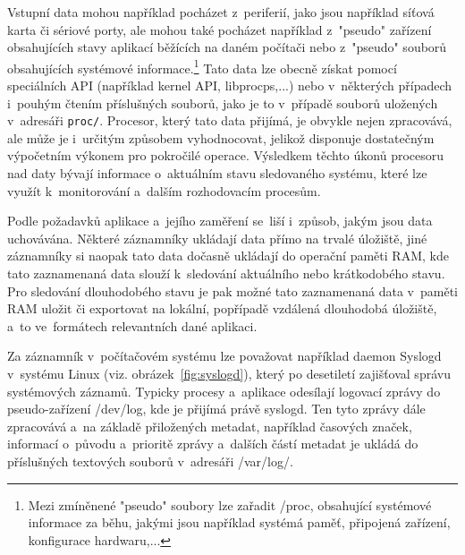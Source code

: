 Vstupní data mohou například pocházet z~periferií, jako jsou například síťová karta či sériové porty, ale mohou také pocházet například z~"pseudo" zařízení obsahujících stavy aplikací běžících na daném počítači nebo z~"pseudo" souborů obsahujících systémové informace.\footnote{Mezi zmíněnené "pseudo" soubory lze zařadit /proc, obsahující systémové informace za běhu, jakými jsou například systémá paměť, připojená zařízení, konfigurace hardwaru,...} Tato data lze obecně získat pomocí speciálních API (například kernel API, libprocps,...) nebo v~některých případech i~pouhým čtením příslušných souborů, jako je to v~případě souborů uložených v~adresáři \texttt{proc/}. Procesor, který tato data přijímá, je obvykle nejen zpracovává, ale může je i~určitým způsobem vyhodnocovat, jelikož disponuje dostatečným výpočetním výkonem pro pokročilé operace. Výsledkem těchto úkonů procesoru nad daty bývají informace o~aktuálním stavu sledovaného systému, které lze využít k~monitorování a~dalším rozhodovacím procesům.~\cite{linux_libprocsp, linux_in_action_log_and_monitoring}

% 
Podle požadavků aplikace a~jejího zaměření se~liší i~způsob, jakým jsou data uchovávána. Některé záznamníky ukládají data přímo na trvalé úložiště, jiné záznamníky si naopak tato data dočasně ukládají do operační paměti RAM, kde tato zaznamenaná data slouží k~sledování aktuálního nebo krátkodobého stavu. Pro sledování dlouhodobého stavu je pak možné tato zaznamenaná data v~paměti RAM uložit či exportovat na lokální, popřípadě vzdálená dlouhodobá úložiště, a~to ve~formátech relevantních dané aplikaci.~\cite{labview, linux_in_action_log_and_monitoring}

Za záznamník v~počítačovém systému lze považovat například daemon Syslogd v~systému Linux (viz. obrázek~\ref{fig:syslogd}), který po desetiletí zajišťoval správu systémových záznamů. Typicky procesy a~aplikace odesílají logovací zprávy do pseudo-zařízení /dev/log, kde je přijímá právě syslogd. Ten tyto zprávy dále zpracovává a~na základě přiložených metadat, například časových značek, informací o~původu a~prioritě zprávy a~dalších částí metadat je ukládá do příslušných textových souborů v~adresáři /var/log/.~\cite{linux_in_action_log_and_monitoring}


